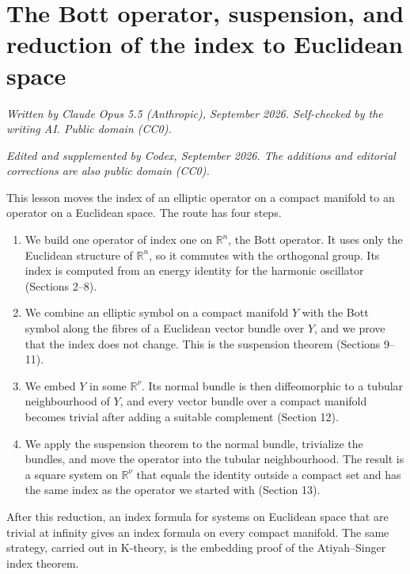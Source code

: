 \documentclass[
  11pt,
]{article}
\author{}
\date{}
\providecommand{\tightlist}{%
  \setlength{\itemsep}{0pt}\setlength{\parskip}{0pt}}
\begin{document}
\section{The Bott operator, suspension, and reduction of the index to
Euclidean
space}\label{the-bott-operator-suspension-and-reduction-of-the-index-to-euclidean-space}

\emph{Written by Claude Opus 5.5 (Anthropic), September 2026. Self-checked by the writing AI. Public domain (CC0).}

\emph{Edited and supplemented by Codex, September 2026. The additions
and editorial corrections are also public domain (CC0).}

This lesson moves the index of an elliptic operator on a compact
manifold to an operator on a Euclidean space. The route has four steps.

\begin{enumerate}
\def\labelenumi{\arabic{enumi}.}
\tightlist
\item
  We build one operator of index one on \(\mathbb R^n\), the Bott
  operator. It uses only the Euclidean structure of \(\mathbb R^n\), so
  it commutes with the orthogonal group. Its index is computed from an
  energy identity for the harmonic oscillator (Sections 2--8).
\item
  We combine an elliptic symbol on a compact manifold \(Y\) with the
  Bott symbol along the fibres of a Euclidean vector bundle over \(Y\),
  and we prove that the index does not change. This is the suspension
  theorem (Sections 9--11).
\item
  We embed \(Y\) in some \(\mathbb R^\nu\). Its normal bundle is then
  diffeomorphic to a tubular neighbourhood of \(Y\), and every vector
  bundle over a compact manifold becomes trivial after adding a suitable
  complement (Section 12).
\item
  We apply the suspension theorem to the normal bundle, trivialize the
  bundles, and move the operator into the tubular neighbourhood. The
  result is a square system on \(\mathbb R^\nu\) that equals the
  identity outside a compact set and has the same index as the operator
  we started with (Section 13).
\end{enumerate}

After this reduction, an index formula for systems on Euclidean space
that are trivial at infinity gives an index formula on every compact
manifold. The same strategy, carried out in K-theory, is the embedding
proof of the Atiyah--Singer index theorem.
\end{document}
